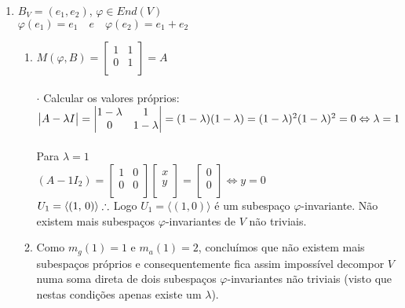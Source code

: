 \documentclass[a4paper, twoside,11pt]{report}
\begin{document}
\begin{enumerate}
\vskip 0.25in

\item
$B_V=(e_1, e_2)$, $\varphi \in End(V)$
\\$\varphi(e_1)=e_1 \quad e \quad \varphi(e_2)=e_1+e_2$
    \begin{enumerate}
        \item $M(\varphi, B)= \begin{bmatrix}
             1 & 1\\
             0 & 1\\
           \end{bmatrix} = A$
\\
\\ $\cdot$ Calcular os valores próprios:
            \\$\begin{vmatrix}
            A - \lambda I\\
            \end{vmatrix}=
           \begin{vmatrix}
           1-\lambda & 1\\
           0 & 1-\lambda\\
           \end{vmatrix}=(1-\lambda) (1-\lambda) = (1-\lambda)^2
           \\(1-\lambda)^2 = 0 \Leftrightarrow \lambda=1  $
           \\
           \\Para $\lambda = 1$
           \\$(A-1I_2)=\begin{bmatrix}
                        1 & 0\\
                        0 & 0\\
                        \end{bmatrix}
                        \begin{bmatrix}
                        x\\
                        y\\
                        \end{bmatrix} = \begin{bmatrix}
                        0\\
                        0\\
                        \end{bmatrix}\Leftrightarrow y=0$
                        \\$U_1 = \langle(1,\, 0)\rangle
                        \\ \therefore$ Logo $U_1=\langle(1,0)\rangle$ é um subespaço $\varphi$-invariante. Não existem mais subespaços $\varphi$-invariantes de $V$ não triviais.
        \item  Como $m_g (1)=1$ e $m_a (1) =2$, concluímos que não existem mais subespaços próprios e consequentemente fica assim impossível decompor $V$ numa soma direta de dois subespaços $\varphi$-invariantes não triviais (visto que nestas condições apenas existe um $\lambda$).
            \end{enumerate}
           

\end{enumerate}
\end{document}
